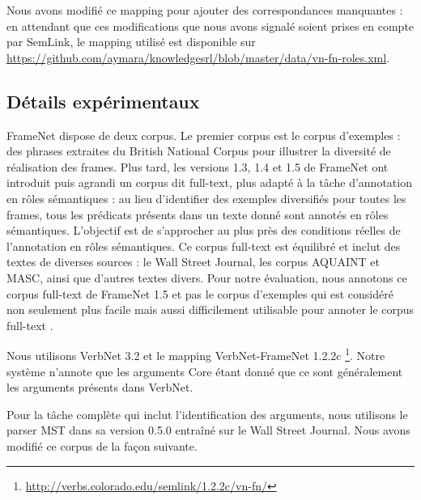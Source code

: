 Nous avons modifié ce mapping pour ajouter des correspondances manquantes : en
attendant que ces modifications que nous avons signalé soient prises en compte
par SemLink, le mapping utilisé est disponible sur
\url{https://github.com/aymara/knowledgesrl/blob/master/data/vn-fn-roles.xml}.


\subsection{Détails expérimentaux}
\label{subsec:details_exp}

FrameNet dispose de deux corpus. Le premier corpus est le corpus d'exemples :
des phrases extraites du British National Corpus pour illustrer la diversité de
réalisation des frames. Plus tard, les versions 1.3, 1.4 et 1.5 de FrameNet ont
introduit puis agrandi un corpus dit full-text, plus adapté à la tâche
d'annotation en rôles sémantiques : au lieu d'identifier des exemples
diversifiés pour toutes les frames, tous les prédicats présents dans un texte
donné sont annotés en rôles sémantiques. L'objectif est de s'approcher au plus
près des conditions réelles de l'annotation en rôles sémantiques. Ce corpus
full-text est équilibré et inclut des textes de diverses sources : le Wall
Street Journal, les corpus AQUAINT et MASC, ainsi que d'autres textes divers.
Pour notre évaluation, nous annotons ce corpus full-text de FrameNet 1.5 et pas
le corpus d'exemples qui est considéré non seulement plus facile mais aussi
difficilement utilisable pour annoter le corpus full-text
\citep[section~2.1]{das2010probabilistic}. 

Nous utilisons VerbNet 3.2 et le mapping VerbNet-FrameNet 1.2.2c
\footnote{\url{http://verbs.colorado.edu/semlink/1.2.2c/vn-fn/}}. Notre système
n'annote que les arguments Core étant donné que ce sont généralement les
arguments présents dans VerbNet.

Pour la tâche complète qui inclut l'identification des arguments, nous
utilisons le parser MST dans sa version 0.5.0 \citep{mcdonald2006multilingual}
entraîné sur le Wall Street Journal. Nous avons modifié ce corpus de la façon
suivante.

